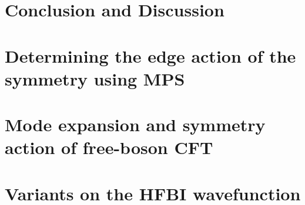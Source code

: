 
\section{Conclusion and Discussion}

\appendix

\section{Determining the edge action of the symmetry using MPS}
\label{Appendix:CFT}


\section{Mode expansion and symmetry action of free-boson CFT}
\label{Appendix:CFT}

\section{Variants on the HFBI wavefunction}
\label{Appendix:Variants}